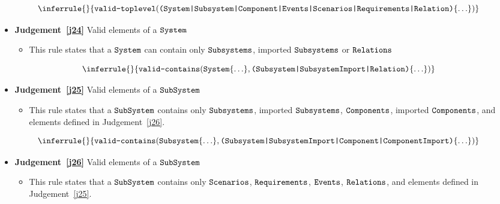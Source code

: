 \documentclass{article}
\begin{document}
\begin{equation}
\label{j23}
\inferrule{
}{\validtop{\lab{(System|Subsystem|Component|Events|Scenarios|Requirements|Relation)}\{\ldots\}}
}
\end{equation}



\begin{itemize}
\item \textbf{Judgement~\ref{j24}} Valid elements of a $\texttt{System}$
\begin{itemize}
\item This rule states that a $\texttt{System}$ can contain only $\texttt{Subsystems}$, imported $\texttt{Subsystems}$ or $\texttt{Relations}$
\end{itemize}
\end{itemize}

\begin{equation}
\label{j24}
\inferrule{
}{\validcontains{\lab{System}\{\ldots\}}{\lab{(Subsystem|SubsystemImport|Relation)}\{\ldots\}}
}
\end{equation}

\begin{itemize}
\item \textbf{Judgement~\ref{j25}} Valid elements of a $\texttt{SubSystem}$
\begin{itemize}
\item This rule states that a $\texttt{SubSystem}$ contains only $\texttt{Subsystems}$, imported $\texttt{Subsystems}$, $\texttt{Components}$, imported $\texttt{Components}$, and elements defined in Judgement~\ref{j26}.
\end{itemize}
\end{itemize}

\begin{equation}
\label{j25}
\inferrule{
}{\validcontains{\lab{Subsystem}\{\ldots\}}{\lab{(Subsystem|SubsystemImport|Component|ComponentImport)}\{\ldots\}}
}
\end{equation}

\begin{itemize}
\item \textbf{Judgement~\ref{j26}} Valid elements of a $\texttt{SubSystem}$
\begin{itemize}
\item This rule states that a $\texttt{SubSystem}$ contains only $\texttt{Scenarios}$, $\texttt{Requirements}$, $\texttt{Events}$, $\texttt{Relations}$, and elements defined in Judgement~\ref{j25}.
\end{itemize}
\end{itemize}
\end{document}

